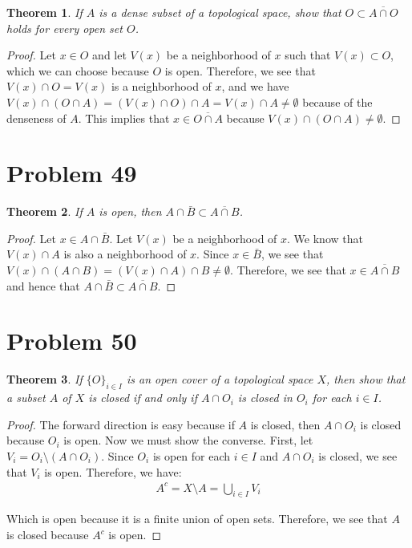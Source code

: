 \documentclass[psamsfonts]{amsart}
\newtheorem{thm}{Theorem}[section]
\theoremstyle{definition}
\theoremstyle{remark}
\numberwithin{equation}{section}
\begin{document}
\begin{thm}
If $A$ is a dense subset of a topological space, show that $O \subset \overline{A \cap O}$ holds for every open set $O$. 
\end{thm}

\begin{proof}
Let $x \in O$ and let $V(x)$ be a neighborhood of $x$ such that $V(x) \subset O$, which we can choose because $O$ is open. Therefore, we see that $V(x) \cap O = V(x)$ is a neighborhood of $x$, and we have $V(x) \cap (O \cap A) = (V(x) \cap O) \cap A = V(x) \cap A \neq \emptyset$ because of the denseness of $A$. This implies that $x \in \overline{ O \cap A}$ because $V(x) \cap ( O \cap A) \neq \emptyset$.   
\end{proof}

\section{Problem 49}

\begin{thm}
If $A$ is open, then $A \cap \bar{B} \subset \overline{A \cap B}$. 
\end{thm}

\begin{proof}
Let $x \in A \cap \bar{B}$. Let $V(x)$ be a neighborhood of $x$. We know that $V(x) \cap A$ is also a neighborhood of $x$. Since $x \in \bar{B}$, we see that $V(x) \cap (A \cap B) = ( V(x) \cap A) \cap B \neq \emptyset$. Therefore, we see that $x \in \overline{A \cap B}$ and hence that $A \cap \bar{B} \subset \overline{A \cap B}$.  
\end{proof}

\section{Problem 50}

\begin{thm}
If $\{ O \}_{i \in I}$ is an open cover of a topological space $X$, then show that a subset $A$ of $X$ is closed if and only if $A \cap O_i$ is closed in $O_i$ for each $i \in I$. 
\end{thm}

\begin{proof}
The forward direction is easy because if $A$ is closed, then $A \cap O_i$ is closed because $O_i$ is open. Now we must show the converse. First, let $V_i = O_i \setminus (A \cap O_i )$. Since $O_i$ is open for each $i \in I$ and $A \cap O_i$ is closed, we see that $V_i$ is open. Therefore, we have:
\begin{eqnarray}
A^c = X \setminus A = \bigcup_{i \in I} V_i 
\end{eqnarray}  

Which is open because it is a finite union of open sets. Therefore, we see that $A$ is closed because $A^c $ is open. 
\end{proof}
\end{document}
